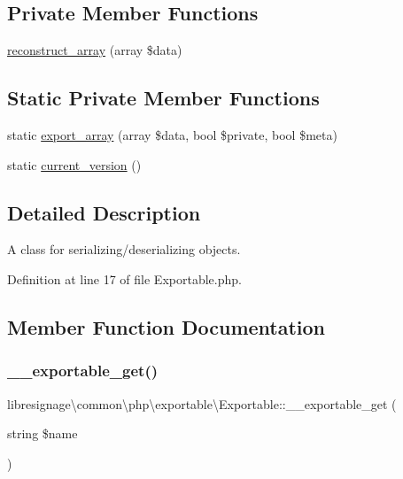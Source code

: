 \subsection*{Private Member Functions}
\begin{DoxyCompactItemize}
\item 
\hyperlink{classlibresignage_1_1common_1_1php_1_1exportable_1_1Exportable_a8c96683fcbb6d40d20026f4da6424d39}{reconstruct\+\_\+array} (array \$data)
\end{DoxyCompactItemize}
\subsection*{Static Private Member Functions}
\begin{DoxyCompactItemize}
\item 
static \hyperlink{classlibresignage_1_1common_1_1php_1_1exportable_1_1Exportable_aa5108e75f3db6bc1f27667db4745f642}{export\+\_\+array} (array \$data, bool \$private, bool \$meta)
\item 
static \hyperlink{classlibresignage_1_1common_1_1php_1_1exportable_1_1Exportable_a96de6ce92106f05004ac53fb06b6a7b7}{current\+\_\+version} ()
\end{DoxyCompactItemize}


\subsection{Detailed Description}
A class for serializing/deserializing objects. 

Definition at line 17 of file Exportable.\+php.



\subsection{Member Function Documentation}
\mbox{\label{classlibresignage_1_1common_1_1php_1_1exportable_1_1Exportable_aa09cde1137746bef66aa3f63bdff65c3}} 
\subsubsection{\texorpdfstring{\+\_\+\+\_\+exportable\+\_\+get()}{\_\_exportable\_get()}}
{\footnotesize\ttfamily libresignage\textbackslash{}common\textbackslash{}php\textbackslash{}exportable\textbackslash{}\+Exportable\+::\+\_\+\+\_\+exportable\+\_\+get (\begin{DoxyParamCaption}\item[{string}]{\$name }\end{DoxyParamCaption})\hspace{0.3cm}{\ttfamily [abstract]}}

